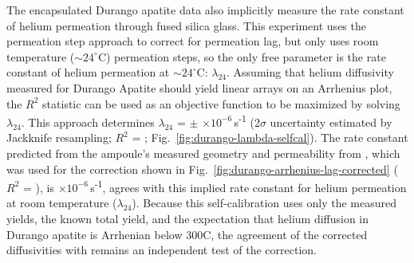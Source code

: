 The encapsulated Durango apatite data also implicitly measure the rate constant of helium permeation through fused silica glass. This experiment uses the permeation step approach to correct for permeation lag, but only uses room temperature ($\sim24^{\circ}$C) permeation steps, so the only free parameter is the rate constant of helium permeation at $\sim24^{\circ}$C: $\lambda_{24}$. Assuming that helium diffusivity measured for Durango Apatite should yield linear arrays on an Arrhenius plot, the $R^2$ statistic can be used as an objective function to be maximized by solving $\lambda_{24}$. This approach determines \(\lambda_{24}\) = \PaperLamTwentyFourData{} \(\pm\) \PaperLamTwentyFourDataTwoSigma{} \(\times 10^{-6}\)\,s\textsuperscript{-1} (2$\sigma$ uncertainty estimated by Jackknife resampling; \(R^{2}\) = \PaperDurangoRtwoMax; Fig.~\ref{fig:durango-lambda-selfcal}). The rate constant predicted from the ampoule's measured geometry and permeability from \citet{swets1961}, which was used for the correction shown in Fig.~\ref{fig:durango-arrhenius-lag-corrected} (\(R^{2}\) = \PaperDurangoRtwoPred), is \PaperLamTwentyFourPred{} \(\times 10^{-6}\)\,s\textsuperscript{-1}, agrees with this implied rate constant for helium permeation at room temperature ($\lambda_{24}$). Because this self-calibration uses only the measured yields, the known total yield, and the expectation that helium diffusion in Durango apatite is Arrhenian below 300\textdegree C, the agreement of the corrected diffusivities with \citet{farley2000} remains an independent test of the correction.

